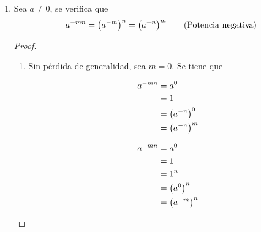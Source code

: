\begin{enumerate}[label=\alph*)]
 \item Sea $a\neq 0$, se verifica que \[a^{-mn} = \qty(a^{-m})^n = \qty(a^{-n})^m \qquad \text{(Potencia negativa)}\]
  \begin{proof}\leavevmode
    \begin{enumerate}[label=\Roman*)]
      \item Sin pérdida de generalidad, sea $m=0$. Se tiene que
      \begin{center}
      \begin{minipage}[c]{.3\linewidth}
      \begin{align*}
        a^{-mn} &= a^0\\
        &= 1\\
        &= \qty(a^{-n})^0\\
        &= \qty(a^{-n})^m 
      \end{align*}
      \end{minipage}
      \begin{minipage}[c]{.3\linewidth}
      \begin{align*}
        a^{-mn} &= a^0\\
        &= 1\\
        &= 1^n\\
        &= \qty(a^0)^n\\
        &= \qty(a^{-m})^n
      \end{align*}
      \end{minipage}
      \end{center}
      

\end{enumerate}
\end{proof}
\end{enumerate}
